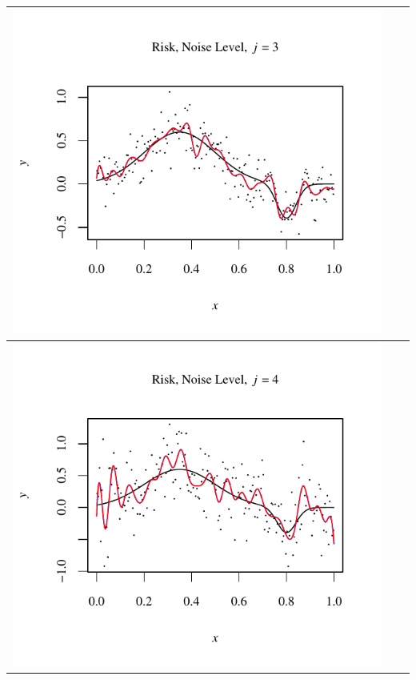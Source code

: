 \documentclass[11pt]{article}
\begin{document}
\begin{table}[h!]
\begin{center}
\begin{tabular}{| >{\centering\arraybackslash}m{2.1in} |  >{\centering\arraybackslash}m{2.1in} |  >{\centering\arraybackslash}m{2.1in}|}
      \includegraphics[width=1\linewidth,height=0.18\textheight]{Graphs/4/1/assignment5_a_4_1_3}\\\hline
      \includegraphics[width=1\linewidth,height=0.18\textheight]{Graphs/4/1/assignment5_a_4_1_4}&

\end{tabular}
\end{center}
\end{table}
\end{document}
